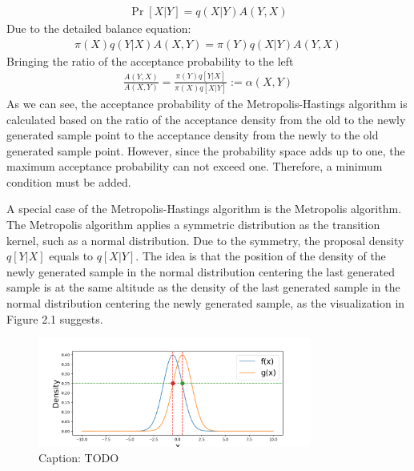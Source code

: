 \begin{align}
\Pr[X|Y] = q(X|Y) A(Y, X)
\end{align}
Due to the detailed balance equation:\cite{mcmc_practice}
\begin{align}
\pi(X) q(Y|X) A(X, Y) = \pi(Y) q(X|Y) A(Y, X)
\end{align}
Bringing the ratio of the acceptance probability to the left
\begin{align}
\frac{A(Y, X)}{A(X, Y)} = \frac{\pi(Y)q[Y|X]}{\pi(X)q[X|Y]} := \alpha(X, Y)
\end{align} 
As we can see, the acceptance probability of the Metropolis-Hastings algorithm is calculated based on the ratio of the acceptance density from the old to the newly generated sample point to the acceptance density from the newly to the old generated sample point. However, since the probability space adds up to one, the maximum acceptance probability can not exceed one. Therefore, a minimum condition must be added.

A special case of the Metropolis-Hastings algorithm is the Metropolis algorithm. The Metropolis algorithm applies a symmetric distribution as the transition kernel, such as a normal distribution.\cite{metropolis} Due to the symmetry, the proposal density $q[Y|X]$ equals to $q[X|Y]$. The idea is that the position of the density of the newly generated sample in the normal distribution centering the last generated sample is at the same altitude as the density of the last generated sample in the normal distribution centering the newly generated sample, as the visualization in Figure 2.1 suggests. 
\begin{figure}
    \centering
    \includegraphics[width=0.8\textwidth]{figures/mcmc_example/proof.png}
    \captionsetup{width=.8\textwidth}
    \caption{Caption: TODO}
    \label{fig:enter-label}
\end{figure}

